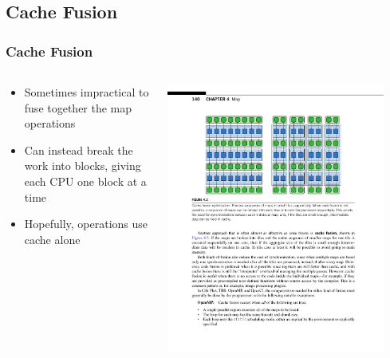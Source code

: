 \documentclass[xcolor=dvipsnames]{beamer}
\begin{document}
	\subsection{Cache Fusion}
		\begin{frame} \frametitle{Cache Fusion}
			\begin{columns}
        		\begin{column}{0.48\textwidth}
          			\begin{itemize}
            			\item Sometimes impractical to fuse together the map 
                        operations
            			\item Can instead break the work into blocks, giving 
                        each CPU one block at a time
            			\item Hopefully, operations use cache alone
          			\end{itemize}
        		\end{column}
	        	\begin{column}{0.48\textwidth}
	          		\centering
	          		\includegraphics[width=0.9\textwidth]{images/figure-4-3-2}
	        	\end{column}
      		\end{columns}
		\end{frame}
\end{document}
